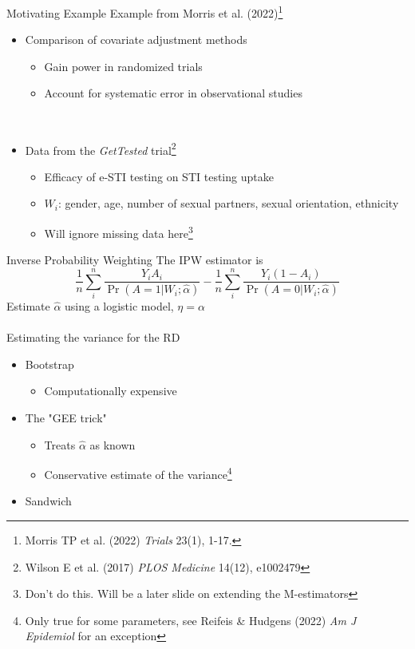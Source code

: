 \documentclass{beamer}
\begin{document}
\begin{frame}{Motivating Example}
	Example from Morris et al. (2022)\footnote[frame]{Morris TP et al. (2022) \textit{Trials} 23(1), 1-17.}
	\begin{itemize}
		\item Comparison of covariate adjustment methods
		\begin{itemize}
			\item Gain power in randomized trials
			\item Account for systematic error in observational studies
		\end{itemize}~\\
		\item Data from the \textit{GetTested} trial\footnote[frame]{Wilson E et al. (2017) \textit{PLOS Medicine} 14(12), e1002479}
		\begin{itemize}
			\item Efficacy of e-STI testing on STI testing uptake
			\item $W_i$: gender, age, number of sexual partners, sexual orientation, ethnicity
			\item Will ignore missing data here\footnote[frame]{Don't do this. Will be a later slide on extending the M-estimators}
		\end{itemize}
	\end{itemize}
\end{frame}

\begin{frame}{Inverse Probability Weighting}
	The IPW estimator is 
	\[\frac{1}{n} \sum_i^n \frac{Y_i A_i}{\Pr(A=1 | W_i ; \hat{\alpha})} - \frac{1}{n} \sum_i^n \frac{Y_i (1-A_i)}{\Pr(A=0 | W_i ; \hat{\alpha})}\]
	Estimate $\hat{\alpha}$ using a logistic model, $\eta = \alpha$
	\\~\\
	Estimating the variance for the RD
	\begin{itemize}
		\item Bootstrap
		\begin{itemize}
			\item Computationally expensive
		\end{itemize}
		\item The "GEE trick"
		\begin{itemize}
			\item Treats $\hat{\alpha}$ as known
			\item Conservative estimate of the variance\footnote[frame]{Only true for some parameters, see Reifeis \& Hudgens (2022) \textit{Am J Epidemiol} for an exception}
		\end{itemize}
		\item Sandwich
	\end{itemize}
\end{frame}
\end{document}

